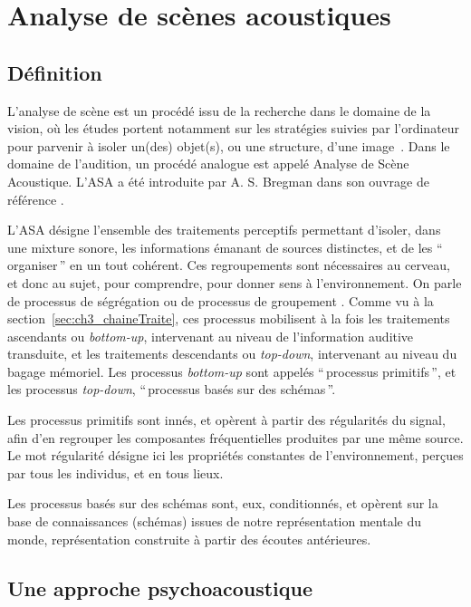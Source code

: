 \section{Analyse de scènes acoustiques}
\label{sec:ch3_ASA}

\subsection{Définition}
\label{sec:ch3_ASAintro}

L'analyse de scène est un procédé issu de la recherche dans le domaine de la vision, où les études portent notamment sur les stratégies suivies par l'ordinateur pour parvenir à isoler un(des) objet(s), ou une structure, d'une image~\citep[p. 12]{mcadams1994penser}. Dans le domaine de l'audition, un procédé analogue est appelé Analyse de Scène Acoustique. L'ASA a été introduite par A. S. Bregman dans son ouvrage de référence \citep{bregman1994auditory}.

L'ASA désigne l'ensemble des traitements perceptifs permettant d'isoler, dans une mixture sonore, les informations émanant de sources distinctes, et de les ``\,organiser\,'' en un tout cohérent. Ces regroupements sont nécessaires au cerveau, et donc au sujet, pour comprendre, pour donner sens à l'environnement. On parle de processus de ségrégation ou de processus de groupement \citep{winkler2009modeling}. Comme vu à la section~\ref{sec:ch3_chaineTraite}, ces processus mobilisent à la fois les traitements ascendants ou \emph{bottom-up}, intervenant au niveau de l'information auditive transduite, et les traitements descendants ou \emph{top-down}, intervenant au niveau du bagage mémoriel. Les processus \emph{bottom-up} sont appelés ``\,processus primitifs\,'', et les processus  \emph{top-down}, ``\,processus basés sur des schémas\,''. 

Les processus primitifs sont innés, et opèrent à partir des régularités du signal, afin d'en regrouper les composantes fréquentielles produites par une même source. Le mot régularité désigne ici les propriétés constantes de l'environnement, perçues par tous les individus, et en tous lieux.

Les processus basés sur des schémas sont, eux, conditionnés, et opèrent sur la base de connaissances (schémas) issues de notre représentation mentale du monde, représentation construite à partir des écoutes antérieures.

\subsection{Une approche psychoacoustique}

